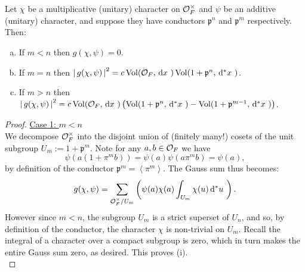 \documentclass[11pt, x11names]{book}
\newcommand{\pp}{\mathfrak{p}}
\newcommand{\brangle}[1]{\left\langle #1 \right\rangle}
\renewcommand{\brack}[1]{\left(   #1 \right)}
\newcommand{\abs}[1]{\left| \, #1  \,\right|}
\newcommand{\dx}{\, \mathrm{d}x \ }
\renewcommand{\d}[1]{\, \mathrm{d}#1 \ }
\DeclareMathOperator{\vol}{Vol}
\begin{document}
\begin{lemma}
\label{lemma: gauss-sum conductor relations}
Let $\chi$ be a multiplicative (unitary) character on $\mathcal{O}_F^\times$ and $\psi$ be an additive (unitary) character, and suppose they have conductors $\pp^n$ and $\pp^m$ respectively. Then:
\begin{enumerate}[(a)]
    \item If $m < n$ then $g(\chi, \psi) = 0$.
    \item If $m = n$ then $\abs{g(\chi, \psi)}^2 = c \vol(\calo_F, \dx) \vol(1 + \pp^n, \d{^*x})$.
    \item If $m > n$ then $\abs{g(\chi, \psi)}^2 = c \vol(\calo_F, \dx) \brack{\vol(1 + \pp^n, \d{^*x}) - \vol(1 + \pp^{m-1}, \d{^*x})}$.
\end{enumerate}
\end{lemma}
\begin{proof}
\underline{Case 1: $m < n$}\\
We decompose $\mathcal{O}_F^\times$ into the disjoint union of (finitely many!) cosets of the unit subgroup $U_m := 1 + \pp^m$. Note for any $a, b \in \mathcal{O}_F$ we have
\begin{equation*}
    \psi(a(1 + \pi^m b)) = \psi(a) \psi(a\pi^m b) = \psi(a),
\end{equation*}
by definition of the conductor $\pp^m = \brangle{\pi^m}$. The Gauss sum thus becomes:
\begin{equation*}
    g(\chi, \psi) = \sum_{\calo_F^\times/U_m} \brack{\psi(a) \chi(a) \int_{U_m} \chi(u) \d{^*u}}.
\end{equation*}
However since $m < n$, the subgroup $U_m$ is a strict superset of $U_n$, and so, by definition of the conductor, the character $\chi$ is non-trivial on $U_m$. Recall the integral of a character over a compact subgroup is zero, which in turn makes the entire Gauss sum zero, as desired. This proves (i).\\


\end{proof}
\end{document}
